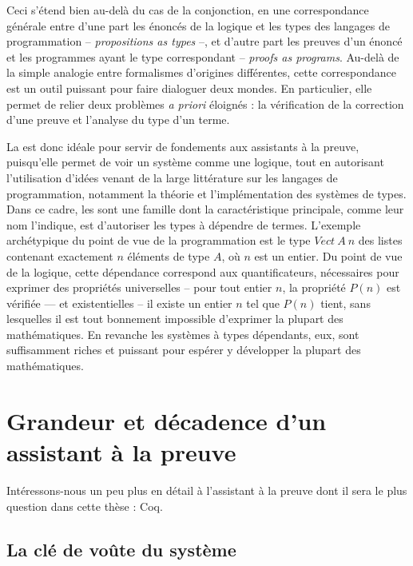 Ceci s’étend bien au-delà du cas de la conjonction,
en une correspondance générale entre d’une part les énoncés de la logique et les types des langages de programmation – \emph{propositions as types} –, et d’autre part les preuves d’un énoncé et les programmes ayant le type correspondant – \emph{proofs as programs}.
Au-delà de la simple analogie entre formalismes d’origines différentes, cette correspondance est un outil puissant pour faire dialoguer deux mondes.
En particulier, elle permet de relier deux problèmes \textit{a priori} éloignés :
la vérification de la correction d’une preuve et l’analyse du type d’un terme.

La  est donc idéale pour servir de fondements aux
assistants à la preuve, puisqu’elle permet de voir un système
comme une logique, tout en autorisant l’utilisation d’idées venant de
la large littérature sur les langages de programmation, notamment
la théorie et l’implémentation des systèmes de types.
Dans ce cadre, les  sont une famille dont
la caractéristique principale, comme leur nom l’indique, est d’autoriser les
types à dépendre de termes. L’exemple archétypique du point de vue de la 
programmation est le type
$Vect~A~n$ des listes contenant exactement $n$ éléments
de type $A$, où $n$ est un entier.
Du point de vue de la logique, cette
dépendance correspond aux quantificateurs, nécessaires pour exprimer des
propriétés universelles – pour tout entier $n$, la propriété $P(n)$ est
vérifiée — et existentielles – il existe un entier $n$ tel que $P(n)$ tient,
sans lesquelles il est tout bonnement impossible d’exprimer la plupart des
mathématiques. En revanche les systèmes à types dépendants, eux, sont suffisamment
riches et puissant pour espérer y développer la plupart des mathématiques.

\section{Grandeur et décadence d’un assistant à la preuve}
\label{sec:intro-coq}

Intéressons-nous un peu plus en détail à l’assistant à la
preuve dont il sera le plus question dans cette thèse : Coq.

\subsection{La clé de voûte du système}

